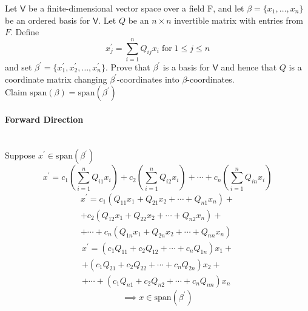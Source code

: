 Let $\mathsf{V}$ be a finite-dimensional vector space over a field F,
and let $\beta=\{x_1,\dotsc,x_n\}$ be an ordered basis for
$\mathsf{V}$. Let $Q$ be an $n\times n$ invertible matrix with
entries from $F$. Define
\[
x^\prime_j = \sum\limits^n_{i=1} Q_{ij}x_i \;\text{for}\; 1\leq j\leq n
\]
and set $\beta^\prime =
\{x_1^\prime,x_2^\prime,\dots,x_n^\prime\}$. Prove that $\beta^\prime$
is a basis for $\mathsf{V}$ and hence that $Q$ is a coordinate matrix
changing $\beta^\prime$-coordinates into $\beta$-coordinates.
\\Claim $\text{span}(\beta) =\text{span}(\beta^\prime)$
\paragraph{Forward Direction}\hfill\\
Suppose $x^\prime \in \text{span}(\beta^\prime)$ 
\begin{equation}
x^\prime = c_1\left(\sum\limits_{i=1}^nQ_{i1}x_i\right) +
c_2\left(\sum\limits_{i=1}^nQ_{i2}x_i\right) + \cdots +
c_n\left(\sum\limits_{i=1}^nQ_{in}x_i\right)
\end{equation}
\begin{multline}
x^\prime = c_1\left(Q_{11}x_1 + Q_{21}x_2+\cdots+Q_{n1}x_n\right) + \\
 +c_2\left(Q_{12}x_1 + Q_{22}x_2 + \cdots + Q_{n2}x_n\right)+ \\ 
+ \cdots + c_n\left(Q_{1n}x_1 + Q_{2n}x_2 + \cdots + Q_{nn}x_n\right)
\end{multline}
\begin{multline}
x^\prime = (c_1Q_{11} + c_2Q_{12} + \cdots + c_nQ_{1n})x_1 + \\
+ (c_1Q_{21} +c_2Q_{22} + \cdots + c_nQ_{2n})x_2 +\\
+\cdots + (c_1Q_{n1} + c_2Q_{n2} + \cdots + c_nQ_{nn})x_n
\end{multline}
\begin{equation}
\implies x \in \text{span}(\beta^\prime)
\end{equation}
